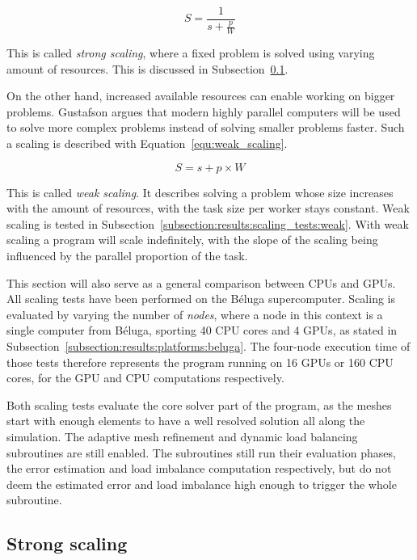 \begin{equation} \label{equ:strong_scaling}
	S = \frac{1}{s + \frac{p}{W}}
\end{equation}

This is called \textit{strong scaling}, where a fixed problem is solved using varying amount of
resources. This is discussed in Subsection~\ref{subsection:results:scaling_tests:strong}.

On the other hand, increased available resources can enable working on bigger problems. Gustafson
argues that modern highly parallel computers will be used to solve more complex problems instead of
solving smaller problems faster. Such a scaling is described with Equation~\ref{equ:weak_scaling}.

\begin{equation} \label{equ:weak_scaling}
	S = s + p \times W
\end{equation}

This is called \textit{weak scaling}. It describes solving a problem whose size increases with the
amount of resources, with the task size per worker stays constant. Weak scaling is tested in
Subsection~\ref{subsection:results:scaling_tests:weak}. With weak scaling a program will scale
indefinitely, with the slope of the scaling being influenced by the parallel proportion of the task.

This section will also serve as a general comparison between CPUs and GPUs. All scaling tests have
been performed on the Béluga supercomputer. Scaling is evaluated by varying the number of
\textit{nodes}, where a node in this context is a single computer from Béluga, sporting 40 CPU cores
and 4 GPUs, as stated in Subsection~\ref{subsection:results:platforms:beluga}. The four-node
execution time of those tests therefore represents the program running on 16 GPUs or 160 CPU cores,
for the GPU and CPU computations respectively.

Both scaling tests evaluate the core solver part of the program, as the meshes start with enough
elements to have a well resolved solution all along the simulation. The adaptive mesh refinement and
dynamic load balancing subroutines are still enabled. The subroutines still run their evaluation
phases, the error estimation and load imbalance computation respectively, but do not deem the
estimated error and load imbalance high enough to trigger the whole subroutine. 

\subsection{Strong scaling} \label{subsection:results:scaling_tests:strong}

